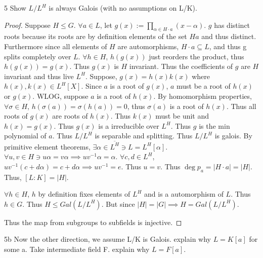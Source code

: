 \documentclass{article}
\begin{document}
\begin{PROB}{5}\label{Problem 5.}
    Show $L/L^H$ is always Galois (with no assumptions on L/K).
\end{PROB}
\begin{proof}
    Suppose $H \leq G$.  
    $\forall a \in L$, let $g(x) := \prod_{\alpha \in H \cdot a}(x - \alpha)$. $g$ has distinct roots because its roots are by definition elements of the set $Ha$ and thus distinct. Furthermore since all elements of $H$ are automorphisms, $H \cdot a \subseteq L$, and thus g splits completely over $L$. $\forall h \in H$, $h(g(x))$ just reorders the product, thus $h(g(x)) = g(x)$. Thus $g(x)$ is $H$ invariant. Thus the coefficients of $g$ are $H$ invariant and thus live $L^H$. Suppose, $g(x) = h(x)k(x)$ where $h(x), k(x) \in L^H[X]$. Since $a$ is a root of $g(x)$, $a$ must be a root of $h(x)$ or $g(x)$. WLOG, suppose $a$ is a root of $h(x)$. By homomorphism properties, $\forall \sigma \in H$, $h(\sigma(a)) = \sigma(h(a)) = 0$, thus $\sigma(a)$ is a root of $h(x)$. Thus all roots of $g(x)$ are roots of $h(x)$. Thus $k(x)$ must be unit and $h(x) = g(x)$. Thus $g(x)$ is a irreducible over $L^H$. Thus $g$ is the min polynomial of $a$. Thus $L / L^H$ is separable and splitting. Thus $L / L^H$ is galois. By primitive element theorems, $\exists \alpha \in \overline{L^H} \ni L = L^H[\alpha]$. $\forall u, v \in H \ni u \alpha  = v \alpha \implies uv^{-1} \alpha = \alpha$. $\forall c, d \in L^H$, $uv^{-1}(c + d \alpha) = c + d \alpha \implies uv^{-1} = e$. Thus $u = v$. Thus $\deg p_a = |H \cdot a | = |H|$. Thus, $[L : K] = |H|$. 
    
    $\forall h \in H$, $h$ by definition fixes elements of $L^H$ and is a automorphism of $L$. Thus $h \in G$. Thus $H \leq Gal(L / L^H)$. But since $|H| = |G| \implies H = Gal(L / L^H)$. 
    
    Thus the map from subgroups to subfields is injective.     
\end{proof}
\begin{PROB}{5b}\label{Problem 5b.}
    Now the other direction, we assume L/K is Galois. explain why $L= K[a]$ for some a. Take intermediate field F. explain why $L = F[a]$. 
\end{PROB}
\end{document}
